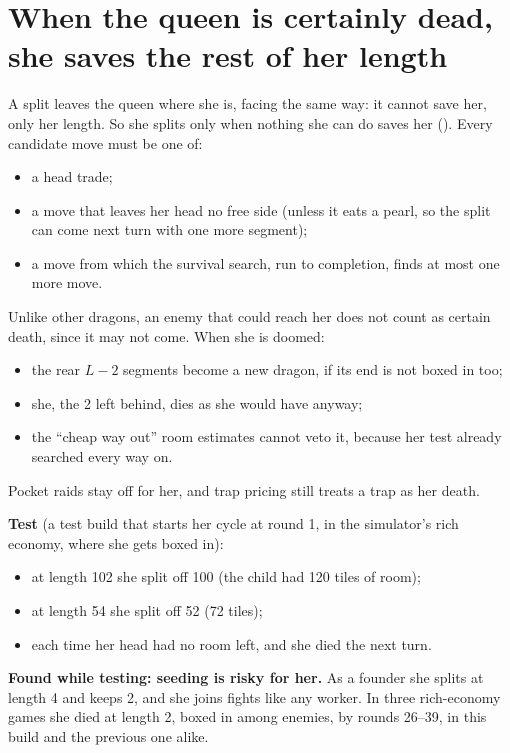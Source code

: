 \documentclass[11pt,a4paper]{article}
\newcommand{\code}[1]{\texttt{\detokenize{#1}}}
\begin{document}
\section{When the queen is certainly dead, she saves the rest of her length}\label{sec:doomed}
A split leaves the queen where she is, facing the same way: it cannot save her, only her length. So she splits only when
nothing she can do saves her (\code{play_split_escape}). Every candidate move must be one of:
\begin{itemize}
      \item a head trade;
      \item a move that leaves her head no free side (unless it eats a pearl, so the split can come next turn with one more segment);
      \item a move from which the survival search, run to completion, finds at most one more move.
\end{itemize}
Unlike other dragons, an enemy that could reach her does not count as certain death, since it may not come. When she is doomed:
\begin{itemize}
      \item the rear $L-2$ segments become a new dragon, if its end is not boxed in too;
      \item she, the 2 left behind, dies as she would have anyway;
      \item the ``cheap way out'' room estimates cannot veto it, because her test already searched every way on.
\end{itemize}
Pocket raids stay off for her, and trap pricing still treats a trap as her death.

\textbf{Test} (a test build that starts her cycle at round 1, in the simulator's rich economy, where she gets boxed in):
\begin{itemize}
      \item at length 102 she split off 100 (the child had 120 tiles of room);
      \item at length 54 she split off 52 (72 tiles);
      \item each time her head had no room left, and she died the next turn.
\end{itemize}

\textbf{Found while testing: seeding is risky for her.} As a founder she splits at length 4 and keeps 2, and she joins fights like
any worker. In three rich-economy games she died at length 2, boxed in among enemies, by rounds 26--39, in this build and the
previous one alike.
\end{document}
